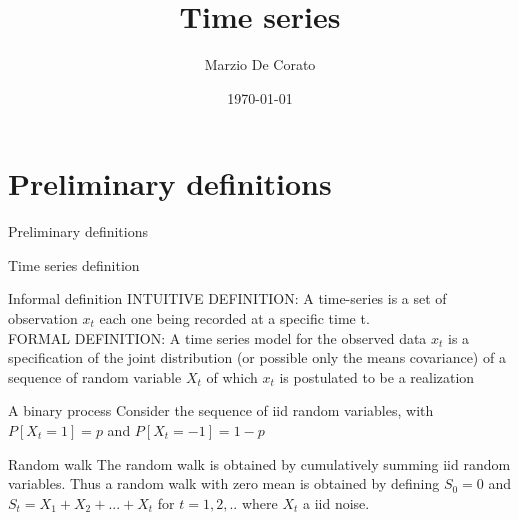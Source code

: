 \documentclass[11pt]{beamer}
\title[Review]{Time series}
\author{Marzio De Corato}
\date{\today}
\begin{document}
\begin{frame}
\vspace{+6.9 cm}  \titlepage
\end{frame}

\usebackgroundtemplate{ } 

\section{Preliminary definitions}


\begin{frame}
\begin{center}
\Huge
Preliminary definitions
\end{center}
\end{frame}

\begin{frame}{Time series definition \cite{brockwell2002introduction}}
\small
\begin{alertblock}{Informal definition}
INTUITIVE DEFINITION: A time-series is a set of observation $x_{t}$ each one being recorded at a specific time t.  \\
FORMAL DEFINITION: A time series model for the observed data ${x}_{t}$ is a specification of the joint distribution (or possible only the means covariance) of a sequence of random variable ${X}_{t}$ of which ${x}_{t}$ is postulated to be a realization
\end{alertblock}
\begin{exampleblock}{A binary process}
Consider the sequence of iid random variables, with $P[X_{t}=1]=p$ and $P[X_{t}=-1]=1-p$
\end{exampleblock}
\begin{exampleblock}{Random walk}
The random walk is obtained by cumulatively summing iid random variables. Thus a random walk with zero mean is obtained by defining $S_{0}=0$ and $S_{t}=X_{1}+X_{2}+...+X_{t}$ for $t=1,2,..$ where ${X_{t}}$ a iid noise. 
\end{exampleblock}
\end{frame}
\end{document}

